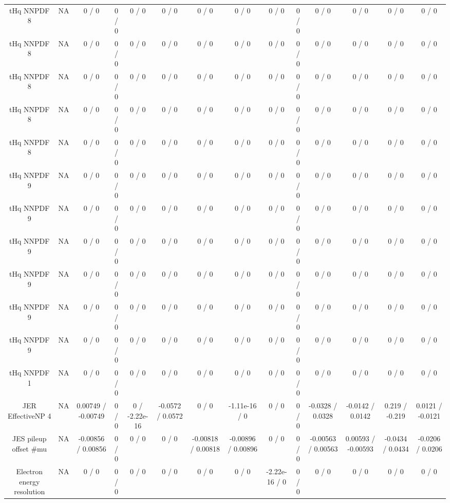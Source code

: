 \documentclass[10pt]{article}
\begin{document}
\begin{table}[htbp]
\begin{center}
\begin{tabular}{|c|c|c|c|c|c|c|c|c|c|c|c|c|c|}
  tHq NNPDF 8 &    NA    & 0 / 0 & 0 / 0 & 0 / 0 & 0 / 0 & 0 / 0 & 0 / 0 & 0 / 0 & 0 / 0 & 0 / 0 & 0 / 0 & 0 / 0 & 0 / 0 \\ 
  tHq NNPDF 8 &    NA    & 0 / 0 & 0 / 0 & 0 / 0 & 0 / 0 & 0 / 0 & 0 / 0 & 0 / 0 & 0 / 0 & 0 / 0 & 0 / 0 & 0 / 0 & 0 / 0 \\ 
  tHq NNPDF 8 &    NA    & 0 / 0 & 0 / 0 & 0 / 0 & 0 / 0 & 0 / 0 & 0 / 0 & 0 / 0 & 0 / 0 & 0 / 0 & 0 / 0 & 0 / 0 & 0 / 0 \\ 
  tHq NNPDF 8 &    NA    & 0 / 0 & 0 / 0 & 0 / 0 & 0 / 0 & 0 / 0 & 0 / 0 & 0 / 0 & 0 / 0 & 0 / 0 & 0 / 0 & 0 / 0 & 0 / 0 \\ 
  tHq NNPDF 8 &    NA    & 0 / 0 & 0 / 0 & 0 / 0 & 0 / 0 & 0 / 0 & 0 / 0 & 0 / 0 & 0 / 0 & 0 / 0 & 0 / 0 & 0 / 0 & 0 / 0 \\ 
  tHq NNPDF 9 &    NA    & 0 / 0 & 0 / 0 & 0 / 0 & 0 / 0 & 0 / 0 & 0 / 0 & 0 / 0 & 0 / 0 & 0 / 0 & 0 / 0 & 0 / 0 & 0 / 0 \\ 
  tHq NNPDF 9 &    NA    & 0 / 0 & 0 / 0 & 0 / 0 & 0 / 0 & 0 / 0 & 0 / 0 & 0 / 0 & 0 / 0 & 0 / 0 & 0 / 0 & 0 / 0 & 0 / 0 \\ 
  tHq NNPDF 9 &    NA    & 0 / 0 & 0 / 0 & 0 / 0 & 0 / 0 & 0 / 0 & 0 / 0 & 0 / 0 & 0 / 0 & 0 / 0 & 0 / 0 & 0 / 0 & 0 / 0 \\ 
  tHq NNPDF 9 &    NA    & 0 / 0 & 0 / 0 & 0 / 0 & 0 / 0 & 0 / 0 & 0 / 0 & 0 / 0 & 0 / 0 & 0 / 0 & 0 / 0 & 0 / 0 & 0 / 0 \\ 
  tHq NNPDF 9 &    NA    & 0 / 0 & 0 / 0 & 0 / 0 & 0 / 0 & 0 / 0 & 0 / 0 & 0 / 0 & 0 / 0 & 0 / 0 & 0 / 0 & 0 / 0 & 0 / 0 \\ 
  tHq NNPDF 9 &    NA    & 0 / 0 & 0 / 0 & 0 / 0 & 0 / 0 & 0 / 0 & 0 / 0 & 0 / 0 & 0 / 0 & 0 / 0 & 0 / 0 & 0 / 0 & 0 / 0 \\ 
  tHq NNPDF 1 &    NA    & 0 / 0 & 0 / 0 & 0 / 0 & 0 / 0 & 0 / 0 & 0 / 0 & 0 / 0 & 0 / 0 & 0 / 0 & 0 / 0 & 0 / 0 & 0 / 0 \\ 
  JER EffectiveNP 4 &    NA    & 0.00749 / -0.00749 & 0 / 0 & 0 / -2.22e-16 & -0.0572 / 0.0572 & 0 / 0 & -1.11e-16 / 0 & 0 / 0 & 0 / 0 & -0.0328 / 0.0328 & -0.0142 / 0.0142 & 0.219 / -0.219 & 0.0121 / -0.0121 \\ 
  JES pileup offset #mu &    NA    & -0.00856 / 0.00856 & 0 / 0 & 0 / 0 & 0 / 0 & -0.00818 / 0.00818 & -0.00896 / 0.00896 & 0 / 0 & 0 / 0 & -0.00563 / 0.00563 & 0.00593 / -0.00593 & -0.0434 / 0.0434 & -0.0206 / 0.0206 \\ 
  Electron energy resolution &    NA    & 0 / 0 & 0 / 0 & 0 / 0 & 0 / 0 & 0 / 0 & 0 / 0 & -2.22e-16 / 0 & 0 / 0 & 0 / 0 & 0 / 0 & 0 / 0 & 0 / 0 \\ 

\end{tabular}
\end{center}
\end{table}
\end{document}
